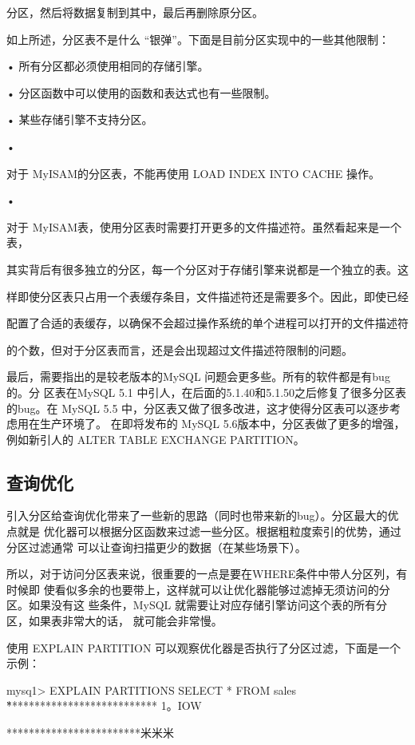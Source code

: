 分区，然后将数据复制到其中，最后再删除原分区。

如上所述，分区表不是什么 “银弹”。下面是目前分区实现中的一些其他限制：

• 所有分区都必须使用相同的存储引擎。

• 分区函数中可以使用的函数和表达式也有一些限制。

• 某些存储引擎不支持分区。

•

对于 MyISAM的分区表，不能再使用 LOAD INDEX INTO CACHE 操作。

•

对于 MyISAM表，使用分区表时需要打开更多的文件描述符。虽然看起来是一个表，

其实背后有很多独立的分区，每一个分区对于存储引擎来说都是一个独立的表。这

样即使分区表只占用一个表缓存条目，文件描述符还是需要多个。因此，即使已经

配置了合适的表缓存，以确保不会超过操作系统的单个进程可以打开的文件描述符

的个数，但对于分区表而言，还是会出现超过文件描述符限制的问题。

最后，需要指出的是较老版本的MySQL 问题会更多些。所有的软件都是有bug的。分
区表在MySQL 5.1 中引人，在后面的5.1.40和5.1.50之后修复了很多分区表的bug。在
MySQL 5.5 中，分区表又做了很多改进，这才使得分区表可以逐步考虑用在生产环境了。
在即将发布的 MySQL 5.6版本中，分区表做了更多的增强，例如新引人的 ALTER TABLE
EXCHANGE PARTITION。

\subsection{查询优化}
引入分区给查询优化带来了一些新的思路（同时也带来新的bug）。分区最大的优点就是
优化器可以根据分区函数来过滤一些分区。根据粗粒度索引的优势，通过分区过滤通常
可以让查询扫描更少的数据（在某些场景下）。

所以，对于访问分区表来说，很重要的一点是要在WHERE条件中带人分区列，有时候即
使看似多余的也要带上，这样就可以让优化器能够过滤掉无须访问的分区。如果没有这
些条件，MySQL 就需要让对应存储引擎访问这个表的所有分区，如果表非常大的话，
就可能会非常慢。

使用 EXPLAIN PARTITION 可以观察优化器是否执行了分区过滤，下面是一个示例：

mysq1> EXPLAIN PARTITIONS SELECT * FROM sales \G

*************************** 1。IOW

************************米米米

